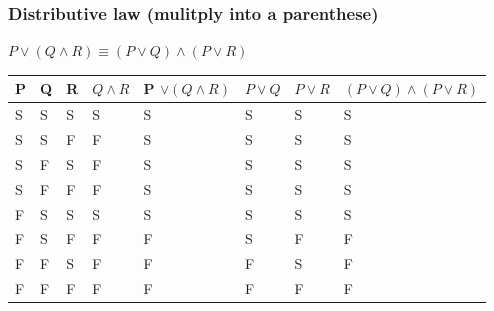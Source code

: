 \documentclass[12pt, a4paper]{article}
\begin{document}
				\subsubsection{Distributive law (mulitply into a parenthese)}
					$P\lor (Q \land R) \equiv (P \lor Q ) \land (P \lor R )$
					\begin{table}[h!]
					\begin{tabular}{|l|l|l|l|l|l|l|l|}
					\hline
					P & Q & R & $Q \land R$ & P $\lor (Q \land R)$ & $P\lor Q$ &$P \lor R$ & $(P\lor Q) \land (P \lor R)$ \\ \hline
					S & S & S & S                        & S                                                & S                      & S                       & S                                                                       \\ \hline
					S & S & F & F                        & S                                                & S                      & S                       & S                                                                       \\ \hline
					S & F & S & F                        & S                                                & S                      & S                       & S                                                                       \\ \hline
					S & F & F & F                        & S                                                & S                      & S                       & S                                                                       \\ \hline
					F & S & S & S                        & S                                                & S                      & S                       & S                                                                       \\ \hline
					F & S & F & F                        & F                                                & S                      & F                       & F                                                                       \\ \hline
					F & F & S & F                        & F                                                & F                      & S                       & F                                                                       \\ \hline
					F & F & F & F                        & F                                                & F                      & F                       & F                                                                       \\ \hline
					\end{tabular}
					\end{table}\\
\end{document}
